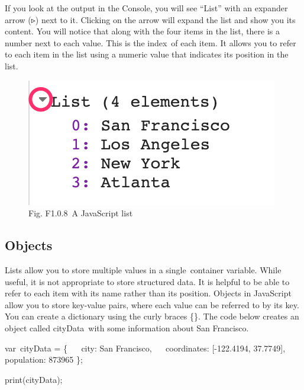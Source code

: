 \documentclass[
  letterpaper,
  DIV=11,
  numbers=noendperiod]{scrreprt}
\newenvironment{Shaded}{\begin{snugshade}}{\end{snugshade}}
\newcommand{\DecValTok}[1]{\textcolor[rgb]{0.68,0.00,0.00}{#1}}
\newcommand{\FloatTok}[1]{\textcolor[rgb]{0.68,0.00,0.00}{#1}}
\newcommand{\FunctionTok}[1]{\textcolor[rgb]{0.28,0.35,0.67}{#1}}
\newcommand{\NormalTok}[1]{\textcolor[rgb]{0.00,0.23,0.31}{#1}}
\newcommand{\OperatorTok}[1]{\textcolor[rgb]{0.37,0.37,0.37}{#1}}
\newcommand{\StringTok}[1]{\textcolor[rgb]{0.13,0.47,0.30}{#1}}
\begin{document}
If you look at the output in the Console, you will see ``List'' with an
expander arrow (▹) next to it. Clicking on the arrow will expand the
list and show you its content. You will notice that along with the four
items in the list, there is a number next to each value. This is the
index~of each item. It allows you to refer to each item in the list
using a numeric value that indicates its position in the list.

\begin{figure}

{\centering \includegraphics{./F1/image10.png}

}

\caption{Fig. F1.0.8~A JavaScript list}

\end{figure}

\hypertarget{objects}{%
\subsection*{Objects}\label{objects}}

Lists allow you to store multiple values in a single~container variable.
While useful, it is not appropriate to store structured data. It is
helpful to be able to refer to each item with its name rather than its
position. Objects in JavaScript allow you to store key-value pairs,
where each value can be referred to by its key. You can create a
dictionary using the curly braces \{\}. The code below creates an object
called cityData~with some information about San Francisco.

\begin{Shaded}
\begin{Highlighting}[]
\NormalTok{var cityData }\OperatorTok{=}\NormalTok{ \{   }
    \StringTok{\textquotesingle{}city\textquotesingle{}}\OperatorTok{:} \StringTok{\textquotesingle{}San Francisco\textquotesingle{}}\OperatorTok{,}   
    \StringTok{\textquotesingle{}coordinates\textquotesingle{}}\OperatorTok{:}\NormalTok{ [}\OperatorTok{{-}}\FloatTok{122.4194}\OperatorTok{,} \FloatTok{37.7749}\NormalTok{]}\OperatorTok{,}   
    \StringTok{\textquotesingle{}population\textquotesingle{}}\OperatorTok{:} \DecValTok{873965} 
\NormalTok{    \}}\OperatorTok{;}  

\FunctionTok{print}\NormalTok{(cityData)}\OperatorTok{;}
\end{Highlighting}
\end{Shaded}
\end{document}
